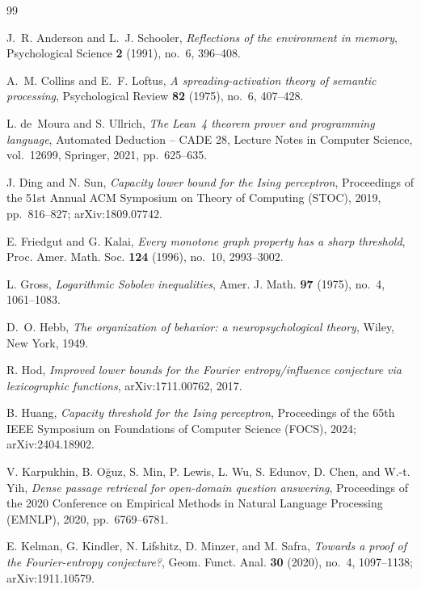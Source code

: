 \begin{thebibliography}{99}

J.~R. Anderson and L.~J. Schooler, \emph{Reflections of the environment in memory}, Psychological Science \textbf{2} (1991), no.~6, 396--408.

A.~M. Collins and E.~F. Loftus, \emph{A spreading-activation theory of semantic processing}, Psychological Review \textbf{82} (1975), no.~6, 407--428.

L. de~Moura and S. Ullrich, \emph{The Lean~4 theorem prover and programming language}, Automated Deduction -- CADE 28, Lecture Notes in Computer Science, vol.~12699, Springer, 2021, pp.~625--635.

J. Ding and N. Sun, \emph{Capacity lower bound for the Ising perceptron}, Proceedings of the 51st Annual ACM Symposium on Theory of Computing (STOC), 2019, pp.~816--827; arXiv:1809.07742.

E. Friedgut and G. Kalai, \emph{Every monotone graph property has a sharp threshold}, Proc. Amer. Math. Soc. \textbf{124} (1996), no.~10, 2993--3002.

L. Gross, \emph{Logarithmic Sobolev inequalities}, Amer. J. Math. \textbf{97} (1975), no.~4, 1061--1083.

D.~O. Hebb, \emph{The organization of behavior: a neuropsychological theory}, Wiley, New York, 1949.

R. Hod, \emph{Improved lower bounds for the Fourier entropy/influence conjecture via lexicographic functions}, arXiv:1711.00762, 2017.

B. Huang, \emph{Capacity threshold for the Ising perceptron}, Proceedings of the 65th IEEE Symposium on Foundations of Computer Science (FOCS), 2024; arXiv:2404.18902.

V. Karpukhin, B. O\u{g}uz, S. Min, P. Lewis, L. Wu, S. Edunov, D. Chen, and W.-t. Yih, \emph{Dense passage retrieval for open-domain question answering}, Proceedings of the 2020 Conference on Empirical Methods in Natural Language Processing (EMNLP), 2020, pp.~6769--6781.

E. Kelman, G. Kindler, N. Lifshitz, D. Minzer, and M. Safra, \emph{Towards a proof of the Fourier-entropy conjecture?}, Geom. Funct. Anal. \textbf{30} (2020), no.~4, 1097--1138; arXiv:1911.10579.


\end{thebibliography}
